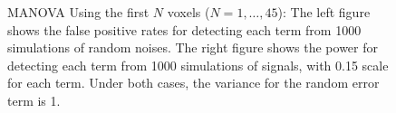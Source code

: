\documentclass[english]{article}\usepackage[]{graphicx}\usepackage[]{color}
\begin{document}
\begin{figure}[H]
\begin{centering}
\par\end{centering}

\centering{}\protect\caption{{\footnotesize{}MANOVA Using the first $N$ voxels ($N=1,\ldots,45$):
The left figure shows the false positive rates for detecting each
term from 1000 simulations of random noises. The right figure shows
the power for detecting each term from 1000 simulations of signals,
with 0.15 scale for each term. Under both cases, the variance for
the random error term is 1.}\label{fig:MANOVA1} }
\end{figure}
\end{document}
